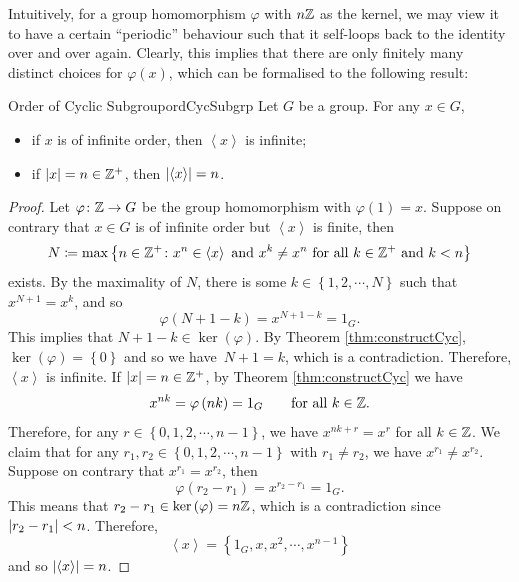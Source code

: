 \documentclass[math]{amznotes}
\theoremstyle{remark}
\newcommand{\cyclic}[1]{\left\langle#1\right\rangle}
\newcommand{\kernel}[1]{\ker\left(#1\right)}
\newcommand{\0}{\mathbf{0}}
\newcommand{\1}{\mathbf{1}}
\begin{document}
Intuitively, for a group homomorphism $\varphi$ with $n\mathbb{Z}$ as the kernel, we may view it to have a certain ``periodic'' behaviour such that it self-loops back to the identity over and over again. Clearly, this implies that there are only finitely many distinct choices for $\varphi\left(x\right)$, which can be formalised to the following result:
\begin{corbox}{Order of Cyclic Subgroup}{ordCycSubgrp}
    Let $G$ be a group. For any $x \in G$,
    \begin{itemize}
        \item if $x$ is of infinite order, then $\left\langle x \right\rangle$ is infinite;
        \item if ${\left\lvert {x} \right\rvert} = n \in \mathbb{Z}^+$, then ${\left\lvert {\left\langle x \right\rangle} \right\rvert} = n$.
    \end{itemize}
    \tcblower
    \begin{proof}
        Let $\varphi \colon \mathbb{Z} \to G$ be the group homomorphism with $\varphi\left(1\right) = x$. Suppose on contrary that $x \in G$ is of infinite order but $\cyclic{x}$ is finite, then 
        \begin{equation*}
            N \coloneqq \max\left\{n \in \Z^+ \colon x^n \in \cyclic{x} \textrm{ and } x^k \neq x^n \textrm{ for all } k \in \Z^+ \textrm{ and } k < n\right\}
        \end{equation*}
        exists. By the maximality of $N$, there is some $k \in \left\{1, 2, \cdots, N\right\}$ such that $x^{N + 1} = x^k$, and so
        \begin{equation*}
            \varphi\left(N + 1 - k\right) = x^{N + 1 - k} = 1_G.  
        \end{equation*}
        This implies that $N + 1 - k \in \kernel{\varphi}$. By Theorem \ref{thm:constructCyc}, $\kernel{\varphi} = \left\{0\right\}$ and so we have~$N + 1 = k$, which is a contradiction. Therefore, $\cyclic{x}$ is infinite. If ${\left\lvert {x} \right\rvert} = n \in \mathbb{Z}^+$, by Theorem \ref{thm:constructCyc} we have 
        \begin{equation*}
            x^{nk} = \varphi\left(nk\right) = 1_G \qquad\textrm{for all } k \in \mathbb{Z}.
        \end{equation*}
        Therefore, for any $r \in \left\{0, 1, 2, \cdots, n - 1\right\}$, we have $x^{nk + r} = x^{r}$ for all $k \in \mathbb{Z}$. We claim that for any $r_1, r_2 \in \left\{0, 1, 2, \cdots, n - 1\right\}$ with $r_1 \neq r_2$, we have $x^{r_1} \neq x^{r_2}$. Suppose on contrary that $x^{r_1} = x^{r_2}$, then 
        \begin{equation*}
            \varphi\left(r_2 - r_1\right) = x^{r_2 - r_1} = 1_G.
        \end{equation*}
        This means that $r_2 - r_1 \in \kernel{\varphi} = n\Z$, which is a contradiction since ${\left\lvert {r_2 - r_1} \right\rvert} < n$. Therefore, \begin{equation*}
            \cyclic{x} = \left\{1_G, x, x^2, \cdots, x^{n - 1}\right\}
        \end{equation*}
        and so $\abs{\cyclic{x}} = n$.
    \end{proof}
\end{corbox}
\end{document}
